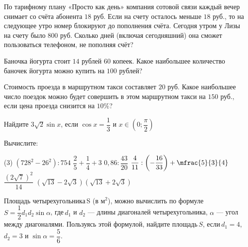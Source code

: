 \begin{exam}
\begin{listofex}
\begin{minipage}[c]{0.3\textwidth}
		\end{minipage}
	\end{listofex}
\end{exam}
%
%
\begin{homework}[number=2]
	\begin{listofex}
		\item По тарифному плану «Просто как день» компания сотовой связи каждый вечер снимает со счёта абонента \( 18 \) руб. Если на счету осталось меньше \( 18 \) руб., то на следующее утро номер блокируют до пополнения счёта. Сегодня утром у Лизы на счету было \( 800 \) руб. Сколько дней (включая сегодняшний) она сможет пользоваться телефоном, не пополняя счёт?
		\item Баночка йогурта стоит \( 14 \) рублей \( 60 \) копеек. Какое наибольшее количество баночек йогурта можно купить на \( 100 \) рублей?
		\item Стоимость проезда в маршрутном такси составляет \( 20 \) руб. Какое наибольшее число поездок можно будет совершить в этом маршрутном такси на \( 150 \) руб., если цена проезда снизится на \( 10\% \)?
		\item Найдите \( 3\sqrt{2}\sin x \), \quad если \( \cos x=\dfrac{1}{3} \) и \( x\in\left( 0;\dfrac{\pi}{2} \right) \)
		\item Вычислите:
		\begin{tasks}(3)
			\task \( (728^2-26^2):754\)
			\task \( \dfrac{2}{5}+\dfrac{1}{4}+3 \)
			\task \( 0,86:\dfrac{43}{20} \)
			\task \( \dfrac{4}{11}:\left( -\dfrac{16}{33} \right)+\mfrac{5}{3}{4} \)
			\task \( \dfrac{(2\sqrt{7})^2}{14} \)
			\task \( (\sqrt{13}-2\sqrt{3})(\sqrt{13}+2\sqrt{3}) \)
		\end{tasks}
		\item Площадь четырехугольника S (в м\( ^2 \)), можно вычислить по формуле \( S=\dfrac{1}{2}d_1d_2\sin\alpha \),  где \( d_1 \) и \( d_2 \) --- длины диагоналей четырехугольника, \( \alpha \) --- угол между диагоналями. Пользуясь этой формулой, найдите площадь \( S \), если \( d_1=4 \), \( d_2=3  \) и \( \sin\alpha=\dfrac{5}{6} \).
	\end{listofex}
\end{homework}
%
